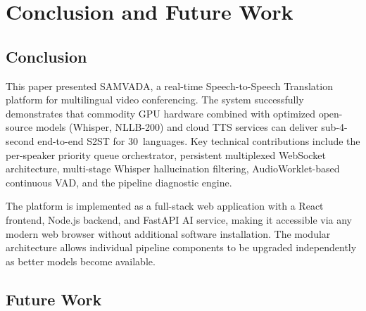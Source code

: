 \documentclass[conference]{IEEEtran}
\begin{document}
\section{Conclusion and Future Work}
\label{sec:conclusion}

\subsection{Conclusion}

This paper presented SAMVADA, a real-time Speech-to-Speech Translation platform for multilingual video conferencing. The system successfully demonstrates that commodity GPU hardware combined with optimized open-source models (Whisper, NLLB-200) and cloud TTS services can deliver sub-4-second end-to-end S2ST for 30~languages. Key technical contributions include the per-speaker priority queue orchestrator, persistent multiplexed WebSocket architecture, multi-stage Whisper hallucination filtering, AudioWorklet-based continuous VAD, and the pipeline diagnostic engine.

The platform is implemented as a full-stack web application with a React frontend, Node.js backend, and FastAPI AI service, making it accessible via any modern web browser without additional software installation. The modular architecture allows individual pipeline components to be upgraded independently as better models become available.

\subsection{Future Work}
\end{document}
